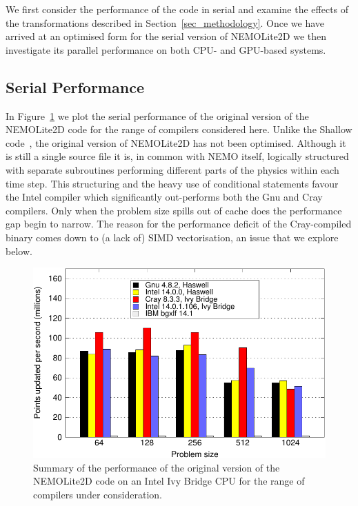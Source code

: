\documentclass[gmd, manuscript]{copernicus}
\newlength{\picwidth}
\begin{document}
We first consider the performance of the code in serial and examine
the effects of the transformations described in
Section~\ref{sec_methodology}. Once we have arrived at an optimised
form for the serial version of NEMOLite2D we then investigate its
parallel performance on both CPU- and GPU-based systems.

\subsection{Serial Performance}

In Figure~\ref{FIG_orig_perf_summary} we plot the serial performance
of the original version of the NEMOLite2D code for the range of
compilers considered here. Unlike the Shallow
code~\citep{shallow_psykal}, the original version of NEMOLite2D has not
been optimised. Although it is still a single source file it is, in
common with NEMO itself, logically structured with separate
subroutines performing different parts of the physics within each time
step. This structuring and the heavy use of conditional statements
favour the Intel compiler which significantly out-performs both the
Gnu and Cray compilers. Only when the problem size spills out of cache
does the performance gap begin to narrow. The reason for the
performance deficit of the Cray-compiled binary comes down to (a lack
of) SIMD vectorisation, an issue that we explore below.

\begin{figure}[!t]
\centering
\includegraphics[width=\picwidth]{orig_summary}
\caption{Summary of the performance of the original version of the 
NEMOLite2D code on an Intel Ivy Bridge CPU for
the range of compilers under consideration.}
\label{FIG_orig_perf_summary}
\end{figure}
\end{document}
